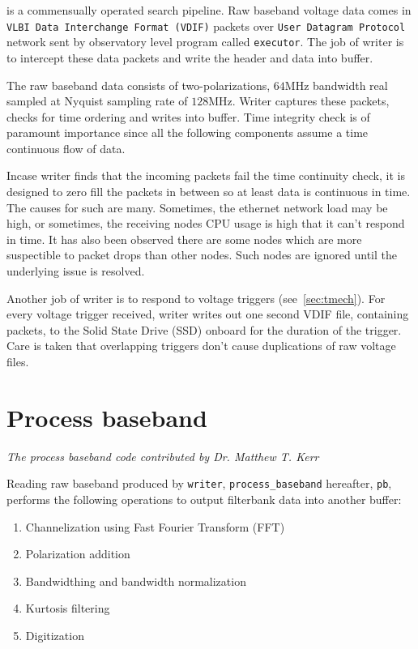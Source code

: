 \par \vf is a commensually operated search pipeline. Raw baseband voltage data comes in \texttt{VLBI Data Interchange Format (VDIF)} packets over
\texttt{User Datagram Protocol} network sent by observatory level program called \texttt{executor}. The job of writer is to intercept these data packets and write the header and data into \dada buffer.

\par The raw baseband data consists of two-polarizations, $64$MHz bandwidth real sampled at Nyquist sampling rate of $128$MHz. Writer captures these packets, checks for time ordering and writes into \dada buffer. Time integrity check is of paramount importance since all the following components assume a time continuous flow of data. 

\par Incase writer finds that the incoming packets fail the time continuity check, it is designed to zero fill the packets in between so at least data is continuous in time. The causes for such are many. 
Sometimes, the ethernet network load may be high, or sometimes, the receiving nodes CPU usage is high that it can't respond in time. 
It has also been observed there are some nodes which are more suspectible to packet drops than other nodes. Such nodes are ignored until the underlying issue is resolved. 

\par Another job of writer is to respond to voltage triggers (see~\autoref{sec:tmech}). For every voltage trigger received, writer writes out one second VDIF file, containing packets, to the Solid State Drive (SSD) onboard for the duration of the trigger. Care is taken that overlapping triggers don't cause duplications of raw voltage files.

\section {Process baseband} 
\hfill \emph {The process baseband code contributed by Dr. Matthew T. Kerr}

\par Reading raw baseband produced by \texttt{writer}, \texttt{process\_baseband} hereafter, \texttt{pb}, performs the following operations to output filterbank data into another \dada buffer:

\begin{enumerate}
\item Channelization using Fast Fourier Transform (FFT)
\item Polarization addition
\item Bandwidthing and bandwidth normalization
\item Kurtosis filtering
\item Digitization
\end{enumerate}

